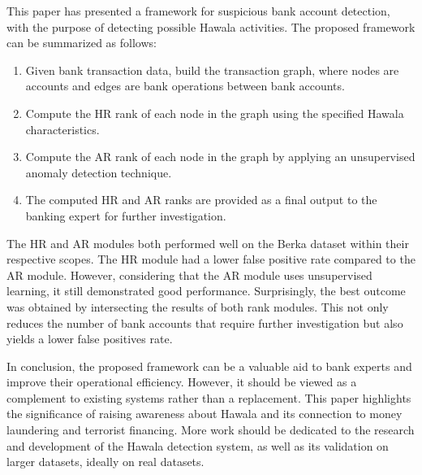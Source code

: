 This paper has presented a framework for suspicious bank account detection, with the purpose of detecting possible Hawala activities. The proposed framework can be summarized as follows:
\begin{enumerate}
    \item Given bank transaction data, build the transaction graph, where nodes are accounts and edges are bank operations between bank accounts.
    \item Compute the HR rank of each node in the graph using the specified Hawala characteristics. 
    \item Compute the AR rank of each node in the graph by applying an unsupervised anomaly detection technique.
    \item The computed HR and AR ranks are provided as a final output to the banking expert for further investigation.
\end{enumerate}

The HR and AR modules both performed well on the Berka dataset within their respective scopes. The HR module had a lower false positive rate compared to the AR module. However, considering that the AR module uses unsupervised learning, it still demonstrated good performance. Surprisingly, the best outcome was obtained by intersecting the results of both rank modules. This not only reduces the number of bank accounts that require further investigation but also yields a lower false positives rate.

In conclusion, the proposed framework can be a valuable aid to bank experts and improve their operational efficiency. However, it should be viewed as a complement to existing systems rather than a replacement. This paper highlights the significance of raising awareness about Hawala and its connection to money laundering and terrorist financing. More work should be dedicated to the research and development of the Hawala detection system, as well as its validation on larger datasets, ideally on real datasets.


